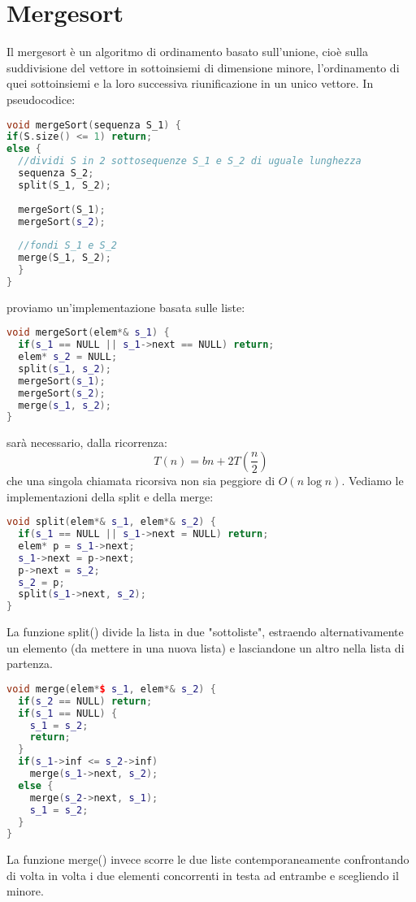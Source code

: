 \documentclass[a4paper,12pt]{article}
\begin{document}
\section{Mergesort}
Il mergesort è un algoritmo di ordinamento basato sull'unione, cioè sulla suddivisione del vettore in sottoinsiemi di dimensione minore,
l'ordinamento di quei sottoinsiemi e la loro successiva riunificazione in un unico vettore. In pseudocodice:
\begin{lstlisting}[language=C++]
void mergeSort(sequenza S_1) {
if(S.size() <= 1) return;
else {
  //dividi S in 2 sottosequenze S_1 e S_2 di uguale lunghezza
  sequenza S_2;
  split(S_1, S_2);
  
  mergeSort(S_1);
  mergeSort(s_2);
  
  //fondi S_1 e S_2
  merge(S_1, S_2);
  }
}
\end{lstlisting}
proviamo un'implementazione basata sulle liste:
\begin{lstlisting}[language=C++]
void mergeSort(elem*& s_1) {
  if(s_1 == NULL || s_1->next == NULL) return;
  elem* s_2 = NULL;
  split(s_1, s_2);
  mergeSort(s_1);
  mergeSort(s_2);
  merge(s_1, s_2);
}
\end{lstlisting}
sarà necessario, dalla ricorrenza:
$$ T(n) = bn + 2T(\frac{n}{2}) $$
che una singola chiamata ricorsiva non sia peggiore di $O(n\log{n})$. Vediamo le implementazioni
della split e della merge:
\begin{lstlisting}[language=C++]
void split(elem*& s_1, elem*& s_2) {
  if(s_1 == NULL || s_1->next = NULL) return;
  elem* p = s_1->next;
  s_1->next = p->next;
  p->next = s_2;
  s_2 = p;
  split(s_1->next, s_2);
}
\end{lstlisting}
La funzione split() divide la lista in due "sottoliste", estraendo alternativamente un elemento (da mettere
in una nuova lista) e lasciandone un altro nella lista di partenza.
\begin{lstlisting}[language=C++]
void merge(elem*$ s_1, elem*& s_2) {
  if(s_2 == NULL) return;
  if(s_1 == NULL) {
    s_1 = s_2;
    return;
  }
  if(s_1->inf <= s_2->inf)
    merge(s_1->next, s_2);
  else {
    merge(s_2->next, s_1);
    s_1 = s_2;
  }
}
\end{lstlisting}
La funzione merge() invece scorre le due liste contemporaneamente confrontando di volta in volta i due elementi
concorrenti in testa ad entrambe e scegliendo il minore.
\end{document}
